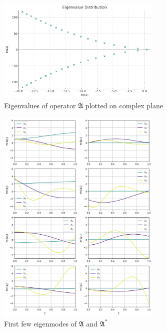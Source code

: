 \begin{figure}[!htbp]
    \centering
    \includegraphics[width=0.7\textwidth]{Figures/eigval_dist_R_0.3.jpg}
    \caption{Eigenvalues of operator $\mathfrak{A}$ plotted on complex plane}
    \label{fig:eigval_dist}
\end{figure}

\begin{figure}[!htbp]
    \centering
    \includegraphics[width=0.7\textwidth]{Figures/eigfuns.png}
    \caption{First few eigenmodes of $\mathfrak{A}$ and $\mathfrak{A}^*$}
    \label{fig:eigfun}
\end{figure}

